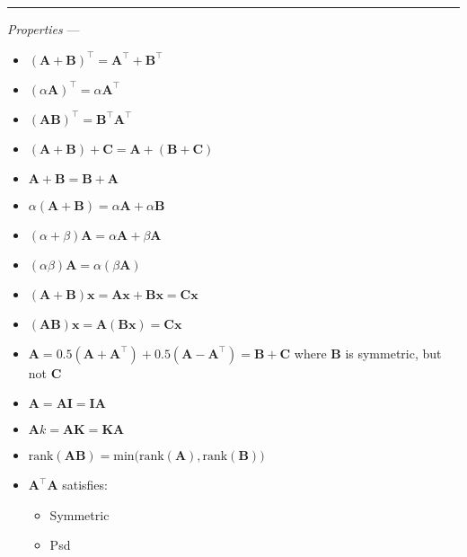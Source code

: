 {\color{lightgray}\hrule height 0.001mm}

\emph{Properties} ---
\begin{multicols}{2}
\begin{itemize}
    \item $(\boldsymbol{A} + \boldsymbol{B})^\intercal = \boldsymbol{A}^\intercal + \boldsymbol{B}^\intercal$
    \item $(\alpha\boldsymbol{A})^\intercal = \alpha \boldsymbol{A}^\intercal$
    \item $(\boldsymbol{A} \boldsymbol{B})^\intercal = \boldsymbol{B}^\intercal \boldsymbol{A}^\intercal$
    \item $(\boldsymbol{A} + \boldsymbol{B}) + \boldsymbol{C} = \boldsymbol{A} + (\boldsymbol{B} + \boldsymbol{C})$
    \item $\boldsymbol{A} + \boldsymbol{B} = \boldsymbol{B} + \boldsymbol{A}$
    \item $\alpha(\boldsymbol{A} + \boldsymbol{B}) = \alpha\boldsymbol{A} + \alpha\boldsymbol{B}$
    \item $(\alpha + \beta)\boldsymbol{A}= \alpha\boldsymbol{A} + \beta\boldsymbol{A}$
    \item $(\alpha\beta)\boldsymbol{A}= \alpha(\beta\boldsymbol{A})$
    \item $(\boldsymbol{A} + \boldsymbol{B})\boldsymbol{x} = \boldsymbol{A}\boldsymbol{x} + \boldsymbol{B}\boldsymbol{x} = \boldsymbol{C}\boldsymbol{x}$
    \item $(\boldsymbol{A} \boldsymbol{B})\boldsymbol{x} = \boldsymbol{A} (\boldsymbol{B} \boldsymbol{x}) = \boldsymbol{C}\boldsymbol{x}$
    \item $\boldsymbol{A} = 0.5(\boldsymbol{A} + \boldsymbol{A}^\intercal) + 0.5(\boldsymbol{A} - \boldsymbol{A}^\intercal) = \boldsymbol{B} + \boldsymbol{C}$ where $\boldsymbol{B}$ is symmetric, but not $\boldsymbol{C}$
    \item $\boldsymbol{A} = \boldsymbol{A}\boldsymbol{I} = \boldsymbol{I}\boldsymbol{A}$
    \item $\boldsymbol{A}k = \boldsymbol{A}\boldsymbol{K} = \boldsymbol{K}\boldsymbol{A}$
    \item $\textrm{rank}(\boldsymbol{A}\boldsymbol{B}) = \textrm{min(rank}(\boldsymbol{A}), \textrm{rank}(\boldsymbol{B}))$
    \item $\boldsymbol{A}^\intercal\boldsymbol{A}$ satisfies: 
    \begin{itemize}
        \item Symmetric
        \item Psd

\end{itemize}
\end{itemize}
\end{multicols}
